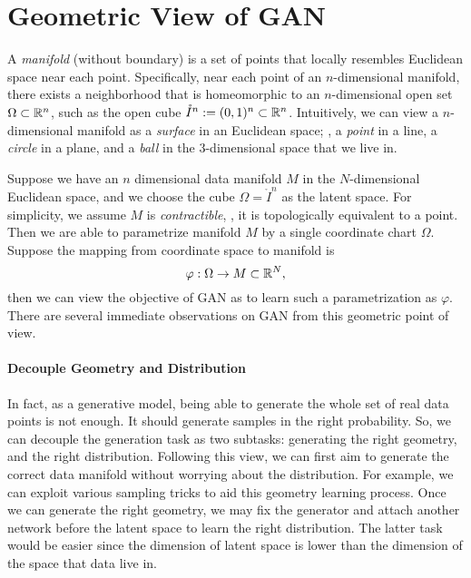 \section{Geometric View of GAN} \label{sec:geom}

A \emph{manifold} (without boundary) is a set of points that
locally resembles Euclidean space near each point.
Specifically,
near each point of an $n$-dimensional manifold,
there exists a neighborhood that is homeomorphic to an $n$-dimensional open
set $\Omega\subset{\mathbb{R}}^n$,
such as the open cube $\mathring{I}^n:=(0,1)^n\subset{\mathbb{R}}^n$.
Intuitively,
we can view a $n$-dimensional manifold as a \emph{surface}
in an Euclidean space;
\eg, a \emph{point} in a line,
a \emph{circle} in a plane,
and a \emph{ball} in the $3$-dimensional space that we live in.

Suppose we have an $n$ dimensional data manifold $M$ in the $N$-dimensional
Euclidean space,
and we choose the cube $\Omega=\mathring{I}^n$ as the latent space.
For simplicity,
we assume $M$ is \emph{contractible},
\ie,
it is topologically equivalent to a point.
Then we are able to parametrize manifold $M$ by a
single coordinate chart $\Omega$.
Suppose the mapping from coordinate space to manifold is
\begin{equation}
    \varphi:\Omega\to M\subset {\mathbb{R}}^N,
\end{equation}
then we can view the objective of GAN as to learn such a
parametrization as $\varphi$.
There are several immediate observations on GAN from this geometric
point of view.

\paragraph{Decouple Geometry and Distribution}
In fact,
as a generative model,
being able to generate the whole set of real data points is not enough.
It should generate samples in the right probability.
So,
we can decouple the generation task as two subtasks:
generating the right geometry,
and the right distribution.
Following this view,
we can first aim to generate the correct data manifold
without worrying about the distribution.
For example,
we can exploit various sampling tricks to aid this geometry learning process.
Once we can generate the right geometry,
we may fix the generator and attach another network before the latent space
to learn the right distribution.
The latter task would be easier since the dimension of latent space is
lower than the dimension of the space that data live in.

